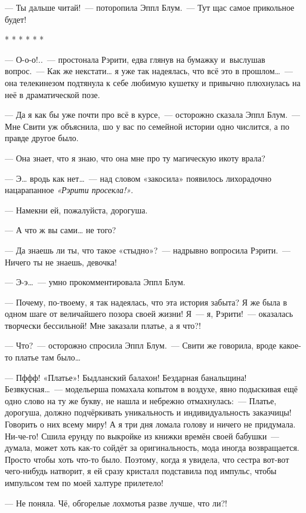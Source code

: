 \documentclass[fontsize=11pt,a5paper,titlepage=firstcover]{scrbook}
\begin{document}
--- Ты дальше читай!~--- поторопила Эппл Блум.~--- Тут щас самое прикольное будет!
\begin{center}* * * * * *\end{center}

--- О-о-о!..~--- простонала Рэрити, едва глянув на бумажку и~выслушав вопрос.~--- Как же некстати{\ldots} я уже так надеялась, что всё это в прошлом{\ldots}~--- она телекинезом подтянула к себе любимую кушетку и привычно плюхнулась на неё в драматической позе.

--- Да я как бы уже почти про всё в курсе,~--- осторожно сказала Эппл Блум.~--- Мне Свити уж объяснила, шо у вас по семейной истории одно числится, а по правде другое было.

--- Она знает, что я знаю, что она мне про ту магическую икоту врала?

--- Э{\ldots} вродь как нет{\ldots}~--- над словом «закосила» появилось лихорадочно нацарапанное \emph{«Рэрити просекла!»}.

--- Намекни ей, пожалуйста, дорогуша.

--- А что ж вы сами{\ldots} не того?

--- Да знаешь ли ты, что такое «стыдно»?~--- надрывно вопросила Рэрити.~--- Ничего ты не знаешь, девочка!

--- Э-э{\ldots}~--- умно прокомментировала Эппл Блум.

--- Почему, по-твоему, я так надеялась, что эта история забыта? Я же была в одном шаге от величайшего позора своей жизни! Я~--- я, Рэрити!~--- оказалась творчески бессильной! Мне заказали платье, а я что?!

--- Что?~--- осторожно спросила Эппл Блум.~--- Свити же говорила, вроде какое-то платье там было{\ldots}

--- Пффф! «Платье»! Быдланский балахон! Бездарная банальщина! Безвкусная{\ldots}~--- модельерша помахала копытом в воздухе, явно подыскивая ещё одно слово на ту же букву, не нашла и небрежно отмахнулась:~--- Платье, дорогуша, должно подчёркивать уникальность и индивидуальность заказчицы! Говорить о них всему миру! А я три дня ломала голову и ничего не придумала. Ни-че-го! Сшила ерунду по выкройке из книжки времён своей бабушки~--- думала, может хоть как-то сойдёт за оригинальность, мода иногда возвращается. Просто чтобы хоть что-то было. Поэтому, когда я увидела, что сестра вот-вот чего-нибудь натворит, я ей сразу кристалл подставила под импульс, чтобы импульсом тем по моей халтуре прилетело!

--- Не поняла. Чё, обгорелые лохмотья разве лучше, что ли?!
\end{document}
